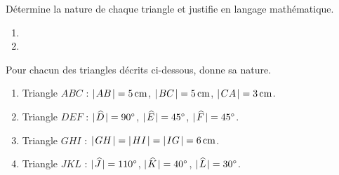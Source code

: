 \documentclass[../../syllabus_1.tex]{subfiles}
\begin{document}
\begin{exercise}
    Détermine la nature de chaque triangle et justifie en langage mathématique.
    \begin{enumerate}
        \item
        \item
    \end{enumerate}
\end{exercise}
\begin{exercise}
    Pour chacun des triangles décrits ci-dessous, donne sa nature.

    \begin{enumerate}[itemsep=2cm]
        \item Triangle $ABC$ : $\lvert\mkern2muAB\mkern2mu\rvert = \qty{5}{cm}$, $\lvert\mkern2muBC\mkern2mu\rvert = \qty{5}{cm}$, $\lvert\mkern2muCA\mkern2mu\rvert = \qty{3}{cm}$.
        \item Triangle $DEF$ : $\lvert\mkern2mu\widehat{D}\mkern2mu\rvert = \ang{90}$, $\lvert\mkern2mu\widehat{E}\mkern2mu\rvert = \ang{45}$, $\lvert\mkern2mu\widehat{F}\mkern2mu\rvert = \ang{45}$.
        \item Triangle $GHI$ : $\lvert\mkern2muGH\mkern2mu\rvert = \lvert\mkern2muHI\mkern2mu\rvert = \lvert\mkern2muIG\mkern2mu\rvert = \qty{6}{cm}$.
        \item Triangle $JKL$ : $\lvert\mkern2mu\widehat{J}\mkern2mu\rvert = \ang{110}$, $\lvert\mkern2mu\widehat{K}\mkern2mu\rvert = \ang{40}$, $\lvert\mkern2mu\widehat{L}\mkern2mu\rvert = \ang{30}$.
    \end{enumerate}
    \vspace*{2cm}
\end{exercise}
\end{document}
